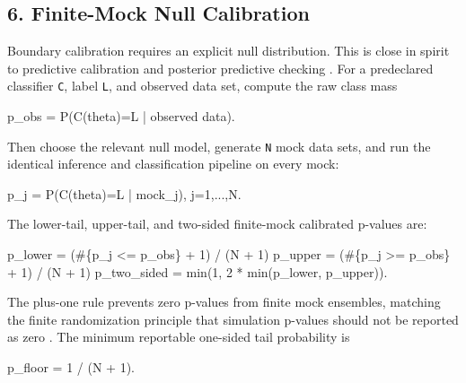 \documentclass[
]{article}
\newenvironment{Shaded}{}{}
\newcommand{\NormalTok}[1]{#1}
\begin{document}
\subsection{6. Finite-Mock Null
Calibration}\label{finite-mock-null-calibration}

Boundary calibration requires an explicit null distribution. This is
close in spirit to predictive calibration and posterior predictive
checking \citep{Dawid1984, Rubin1984, GelmanMengStern1996}. For a
predeclared classifier \texttt{C}, label \texttt{L}, and observed data
set, compute the raw class mass

\begin{Shaded}
\begin{Highlighting}[]
\NormalTok{p\_obs = P(C(theta)=L | observed data).}
\end{Highlighting}
\end{Shaded}

Then choose the relevant null model, generate \texttt{N} mock data sets,
and run the identical inference and classification pipeline on every
mock:

\begin{Shaded}
\begin{Highlighting}[]
\NormalTok{p\_j = P(C(theta)=L | mock\_j),  j=1,...,N.}
\end{Highlighting}
\end{Shaded}

The lower-tail, upper-tail, and two-sided finite-mock calibrated
p-values are:

\begin{Shaded}
\begin{Highlighting}[]
\NormalTok{p\_lower = (\#\{p\_j \textless{}= p\_obs\} + 1) / (N + 1)}
\NormalTok{p\_upper = (\#\{p\_j \textgreater{}= p\_obs\} + 1) / (N + 1)}
\NormalTok{p\_two\_sided = min(1, 2 * min(p\_lower, p\_upper)).}
\end{Highlighting}
\end{Shaded}

The plus-one rule prevents zero p-values from finite mock ensembles,
matching the finite randomization principle that simulation p-values
should not be reported as zero \citep{PhipsonSmyth2010}. The minimum
reportable one-sided tail probability is

\begin{Shaded}
\begin{Highlighting}[]
\NormalTok{p\_floor = 1 / (N + 1).}
\end{Highlighting}
\end{Shaded}
\end{document}
